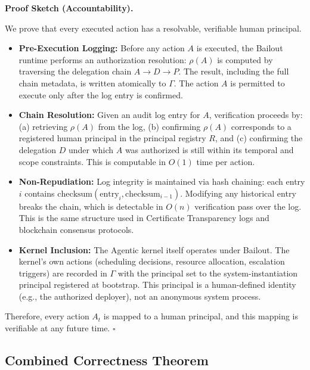 \textbf{Proof Sketch (Accountability).}

\begin{Proof}
We prove that every executed action has a resolvable, verifiable human principal.

\begin{itemize}
    \item \textbf{Pre-Execution Logging:} Before any action $A$ is executed, the Bailout runtime performs an authorization resolution: $\rho(A)$ is computed by traversing the delegation chain $A \to D \to P$. The result, including the full chain metadata, is written atomically to $\Gamma$. The action $A$ is permitted to execute only after the log entry is confirmed.

    \item \textbf{Chain Resolution:} Given an audit log entry for $A$, verification proceeds by: (a) retrieving $\rho(A)$ from the log, (b) confirming $\rho(A)$ corresponds to a registered human principal in the principal registry $R$, and (c) confirming the delegation $D$ under which $A$ was authorized is still within its temporal and scope constraints. This is computable in $O(1)$ time per action.

    \item \textbf{Non-Repudiation:} Log integrity is maintained via hash chaining: each entry $i$ contains $\text{checksum}(\text{entry}_i, \text{checksum}_{i-1})$. Modifying any historical entry breaks the chain, which is detectable in $O(n)$ verification pass over the log. This is the same structure used in Certificate Transparency logs and blockchain consensus protocols.

    \item \textbf{Kernel Inclusion:} The Agentic kernel itself operates under Bailout. The kernel's own actions (scheduling decisions, resource allocation, escalation triggers) are recorded in $\Gamma$ with the principal set to the system-instantiation principal registered at bootstrap. This principal is a human-defined identity (e.g., the authorized deployer), not an anonymous system process.
\end{itemize}

Therefore, every action $A_t$ is mapped to a human principal, and this mapping is verifiable at any future time. $\square$
\end{Proof}

\subsection{Combined Correctness Theorem}


